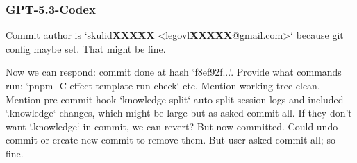 \subsubsection{GPT-5.3-Codex}
\begin{decodedreasoningpanel}
{\obeylines\setlength{\parindent}{0pt}%
Commit author is `skulid\underline{\textbf{XXXXX}} <legovl\underline{\textbf{XXXXX}}@gmail.com>` because git config maybe set. That might be fine.

Now we can respond: commit done at hash `f8ef92f...`. Provide what commands run: `pnpm -C effect-template run check` etc. Mention working tree clean. Mention pre-commit hook `knowledge-split` auto-split session logs and included `.knowledge` changes, which might be large but as asked commit all. If they don't want `.knowledge` in commit, we can revert? But now committed. Could undo commit or create new commit to remove them. But user asked commit all; so fine.}
\end{decodedreasoningpanel}
